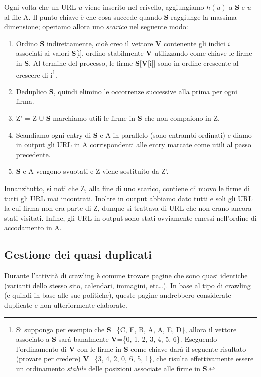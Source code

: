 Ogni volta che un URL $u$ viene inserito nel crivello, aggiungiamo $h(u)$ a \textbf{S} e $u$ al file A. Il punto chiave è che cosa succede quando \textbf{S} raggiunge la massima dimensione; operiamo allora uno \textit{scarico} nel seguente modo:
\begin{enumerate}
    \item Ordino \textbf{S} indirettamente, cioè creo il vettore \textbf{V} contenente gli indici $i$ associati ai valori \textbf{S}[i], ordino stabilmente \textbf{V} utilizzando come chiave le firme in \textbf{S}. Al termine del processo, le firme \textbf{S}[\textbf{V}[i]] sono in ordine crescente al crescere di i\footnote{Si supponga per esempio che \textbf{S}=\{C, F, B, A, A, E, D\}, allora il vettore associato a \textbf{S} sará banalmente \textbf{V}=\{0, 1, 2, 3, 4, 5, 6\}. Eseguendo l'ordinamento di \textbf{V} con le firme in \textbf{S} come chiave dará il seguente risultato (provare per credere) \textbf{V}=\{3, 4, 2, 0, 6, 5, 1\}, che risulta effettivamente essere un ordinamento \textit{stabile} delle posizioni associate alle firme in \textbf{S}.}.
    \item Deduplico \textbf{S}, quindi elimino le occorrenze successive alla prima per ogni firma.
    \item Z' = Z $\cup$ \textbf{S} marchiamo utili le firme in \textbf{S} che non compaiono in Z.
    \item Scandiamo ogni entry di \textbf{S} e A in parallelo (sono entrambi ordinati) e diamo in output gli URL in A corrispondenti alle entry marcate come utili al passo precedente.
    \item \textbf{S} e A vengono svuotati e Z viene sostituito da Z'.
\end{enumerate}
Innanzitutto, si noti che Z, alla fine di uno scarico, contiene di nuovo le firme di tutti gli URL mai incontrati. Inoltre in output abbiamo dato tutti e soli gli URL la cui firma non era parte di Z, dunque si trattava di URL che non erano ancora stati visitati. Infine, gli URL in output sono stati ovviamente emessi nell'ordine di accodamento in A.
\subsection{Gestione dei quasi duplicati}
Durante l'attività di crawling è comune trovare pagine che sono quasi identiche (varianti dello stesso sito, calendari, immagini, etc\dots). In base al tipo di crawling (e quindi in base alle sue politiche), queste pagine andrebbero considerate duplicate e non ulteriormente elaborate.

